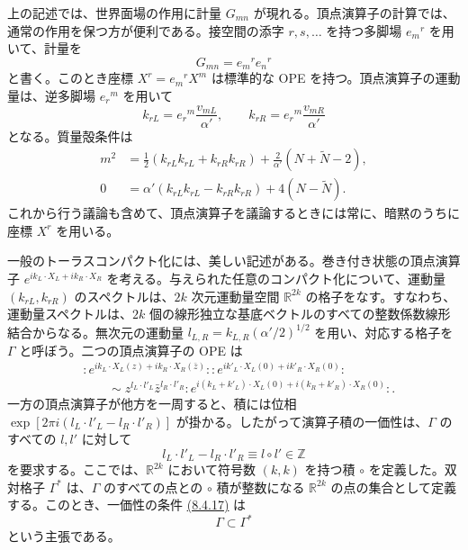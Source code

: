 上の記述では、世界面場の作用に計量 $G_{mn}$ が現れる。頂点演算子の計算では、通常の作用を保つ方が便利である。接空間の添字 $r,s,\ldots$ を持つ多脚場 $e_m{}^r$ を用いて、計量を
\begin{equation}
G_{mn}=e_m{}^re_n{}^r
\tag{8.4.13}\label{eq:8.4.13}
\end{equation}
と書く。このとき座標 $X^r=e_m{}^rX^m$ は標準的な OPE を持つ。頂点演算子の運動量は、逆多脚場 $e_r{}^m$ を用いて
\begin{equation}
k_{rL}=e_r{}^m\frac{v_{mL}}{\alpha'},\qquad
k_{rR}=e_r{}^m\frac{v_{mR}}{\alpha'}
\tag{8.4.14}\label{eq:8.4.14}
\end{equation}
となる。質量殻条件は
\begin{align}
m^2&=\frac12(k_{rL}k_{rL}+k_{rR}k_{rR})+\frac2{\alpha'}(N+\widetilde N-2),
\tag{8.4.15a}\label{eq:8.4.15a}\\
0&=\alpha'(k_{rL}k_{rL}-k_{rR}k_{rR})+4(N-\widetilde N).
\tag{8.4.15b}\label{eq:8.4.15b}
\end{align}
これから行う議論も含めて、頂点演算子を議論するときには常に、暗黙のうちに座標 $X^r$ を用いる。


一般のトーラスコンパクト化には、美しい記述がある。巻き付き状態の頂点演算子 $e^{ik_L\cdot X_L+ik_R\cdot X_R}$ を考える。与えられた任意のコンパクト化について、運動量 $(k_{rL},k_{rR})$ のスペクトルは、$2k$ 次元運動量空間 $\mathbb R^{2k}$ の格子をなす。すなわち、運動量スペクトルは、$2k$ 個の線形独立な基底ベクトルのすべての整数係数線形結合からなる。無次元の運動量 $l_{L,R}=k_{L,R}(\alpha'/2)^{1/2}$ を用い、対応する格子を $\Gamma$ と呼ぼう。二つの頂点演算子の OPE は
\begin{equation}
\begin{aligned}
&:e^{ik_L\cdot X_L(z)+ik_R\cdot X_R(\bar z)}:
:e^{ik'_L\cdot X_L(0)+ik'_R\cdot X_R(0)}:\\
&\qquad\sim z^{l_L\cdot l'_L}\bar z^{l_R\cdot l'_R}
:e^{i(k_L+k'_L)\cdot X_L(0)+i(k_R+k'_R)\cdot X_R(0)}:.
\end{aligned}
\tag{8.4.16}\label{eq:8.4.16}
\end{equation}
一方の頂点演算子が他方を一周すると、積には位相 $\exp[2\pi i(l_L\cdot l'_L-l_R\cdot l'_R)]$ が掛かる。したがって演算子積の一価性は、$\Gamma$ のすべての $l,l'$ に対して
\begin{equation}
l_L\cdot l'_L-l_R\cdot l'_R\equiv l\circ l'\in\mathbb Z
\tag{8.4.17}\label{eq:8.4.17}
\end{equation}
を要求する。ここでは、$\mathbb R^{2k}$ において符号数 $(k,k)$ を持つ積 $\circ$ を定義した。双対格子 $\Gamma^*$ は、$\Gamma$ のすべての点との $\circ$ 積が整数になる $\mathbb R^{2k}$ の点の集合として定義する。このとき、一価性の条件 \hyperref[eq:8.4.17]{(8.4.17)} は
\begin{equation}
\Gamma\subset\Gamma^*
\tag{8.4.18}\label{eq:8.4.18}
\end{equation}
という主張である。

